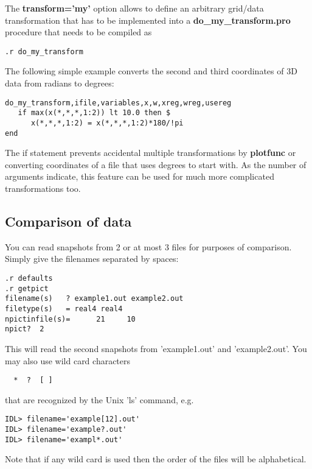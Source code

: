 The {\bf transform='my'} 
option allows to define an arbitrary grid/data transformation
that has to be implemented into a {\bf do\_my\_transform.pro}
procedure that needs to be compiled as
\begin{verbatim}
.r do_my_transform
\end{verbatim}
The following simple example converts the second and third coordinates 
of 3D data from radians to degrees:
\begin{verbatim}
do_my_transform,ifile,variables,x,w,xreg,wreg,usereg
   if max(x(*,*,*,1:2)) lt 10.0 then $
      x(*,*,*,1:2) = x(*,*,*,1:2)*180/!pi
end
\end{verbatim}
The if statement prevents accidental multiple transformations 
by {\bf plotfunc} or converting coordinates of a file that uses 
degrees to start with.
As the number of arguments indicate, this feature can be used for much more 
complicated transformations too.

\subsection{Comparison of data \label{s-compare}}

   You can read snapshots from 2 or at most 3 files for purposes of
   comparison. Simply give the filenames separated by spaces:
\begin{verbatim}
.r defaults
.r getpict
filename(s)   ? example1.out example2.out
filetype(s)   = real4 real4
npictinfile(s)=      21     10
npict?  2
\end{verbatim}
   This will read the second snapshots from 'example1.out' and
   'example2.out'. You may also use wild card characters 
\begin{verbatim}
  *  ?  [ ]
\end{verbatim}
    that are recognized by the Unix 'ls' command, e.g.
\begin{verbatim}
IDL> filename='example[12].out'
IDL> filename='example?.out'
IDL> filename='exampl*.out'
\end{verbatim}
   Note that if any wild card is used then the order of the files will 
   be alphabetical.

